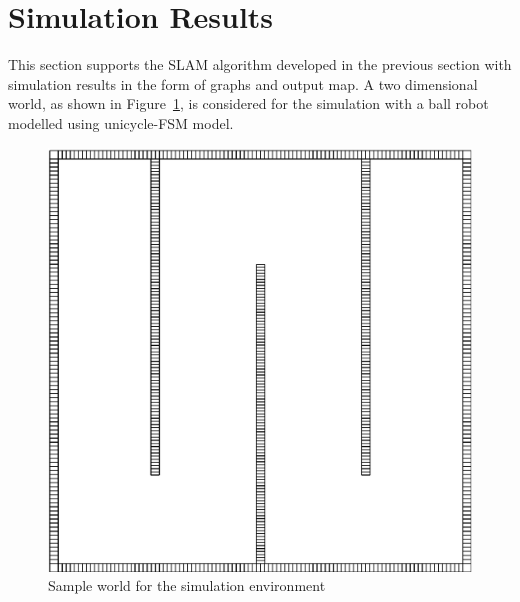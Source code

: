 \section{Simulation Results}
This section supports the SLAM algorithm developed in the previous section with simulation results in the form of graphs and output map. A two dimensional world, as shown in Figure~\ref{sample_world}, is considered for the simulation with a ball robot modelled using unicycle-FSM model.
\begin{figure}
\centering
\includegraphics[scale=0.4]{./images/sample_world}
\caption[Rectilinear world as a simulation environment]{Sample world for the simulation environment}
\label{sample_world}
\end{figure}

